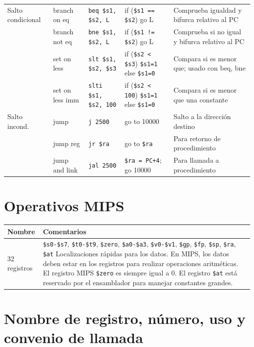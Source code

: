 \documentclass[12pt,a4paper]{article}
\begin{document}
\begin{xltabular}{\textwidth}{>{\raggedright\arraybackslash}p{2.2cm} >{\raggedright\arraybackslash}p{2.2cm} >{\raggedright\arraybackslash}p{3cm} >{\raggedright\arraybackslash}p{3.5cm} X}
			\midrule
			Salto condicional 
			& branch on eq & \texttt{beq \$s1, \$s2, L} & if (\texttt{\$s1 == \$s2}) go L & Comprueba igualdad y bifurca relativo al PC \\
			& branch not eq & \texttt{bne \$s1, \$s2, L} & if (\texttt{\$s1 != \$s2}) go L & Comprueba si no igual y bifurca relativo al PC \\
			& set on less & \texttt{slt \$s1, \$s2, \$s3} & if (\texttt{\$s2 < \$s3}) \texttt{\$s1=1} else \texttt{\$s1=0} & Compara si es menor que; usado con beq, bne \\
			& set on less imm & \texttt{slti \$s1, \$s2, 100}& if (\texttt{\$s2 < 100}) \texttt{\$s1=1} else \texttt{\$s1=0} & Compara si es menor que una constante \\
			\midrule
			Salto incond. 
			& jump & \texttt{j 2500} & go to 10000 & Salto a la dirección destino \\
			& jump reg & \texttt{jr \$ra} & go to \texttt{\$ra} & Para retorno de procedimiento \\
			& jump and link & \texttt{jal 2500} & \texttt{\$ra = PC+4}; go 10000 & Para llamada a procedimiento \\
		\end{xltabular}
		
		\section*{Operativos MIPS}
		
		\begin{table}[H]
			\centering
			\begin{tabularx}{\textwidth}{l X}
				\toprule
				\textbf{Nombre} & \textbf{Comentarios} \\
				\midrule
				32 registros & \texttt{\$s0-\$s7}, \texttt{\$t0-\$t9}, \texttt{\$zero}, \texttt{\$a0-\$a3}, \texttt{\$v0-\$v1}, \texttt{\$gp}, \texttt{\$fp}, \texttt{\$sp}, \texttt{\$ra}, \texttt{\$at} \newline Localizaciones rápidas para los datos. En MIPS, los datos deben estar en los registros para realizar operaciones aritméticas. El registro MIPS \texttt{\$zero} es siempre igual a 0. El registro \texttt{\$at} está reservado por el ensamblador para manejar constantes grandes. \\
				\bottomrule
			\end{tabularx}
		\end{table}
		
		\section*{Nombre de registro, número, uso y convenio de llamada}
		
\end{document}
